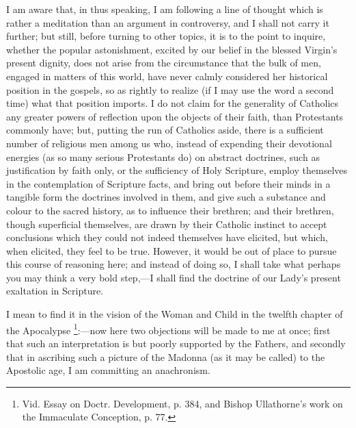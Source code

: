 I am aware that, in thus speaking, I am following a line of thought
which is rather a meditation than an argument in controversy, and I
shall not carry it further; but still, before turning to other topics,
it is to the point to inquire, whether the popular astonishment, excited
by our belief in the blessed Virgin's present dignity, does not
arise from the circumstance that the bulk of men, engaged in matters of
this world, have never calmly considered her historical position in the
gospels, so as rightly to realize (if I may use the word a second time)
what that position imports. I do not claim for the generality of
Catholics any greater powers of reflection upon the objects of their
faith, than Protestants commonly have; but, putting the run of Catholics
aside, there is a sufficient number of religious men among us who,
instead of expending their devotional energies (as so many serious
Protestants do) on abstract doctrines, such as justification by faith
only, or the sufficiency of Holy Scripture, employ themselves in the
contemplation of Scripture facts, and bring out before their minds in a
tangible form the doctrines involved in them, and give such a substance
and colour to the sacred history, as to influence their brethren; and
their brethren, though superficial themselves, are drawn by their
Catholic instinct to accept conclusions which they could not indeed
themselves have elicited, but which, when elicited, they feel to be
true. However, it would be out of place to pursue this course of
reasoning here; and instead of doing so, I shall take what perhaps you
may think a very bold step,—I shall find the doctrine of our Lady's
present exaltation in Scripture.

I mean to find it in the vision of the Woman and Child in the twelfth
chapter of the Apocalypse \footnote{Vid. Essay
on Doctr. Development, p. 384, and Bishop Ullathorne's work on the
Immaculate Conception, p. 77.}:—now
here two objections will be made to me at once; first that such an
interpretation is but poorly supported by the Fathers, and secondly that
in ascribing such a picture of the Madonna (as it may be called) to the
Apostolic age, I am committing an anachronism.

